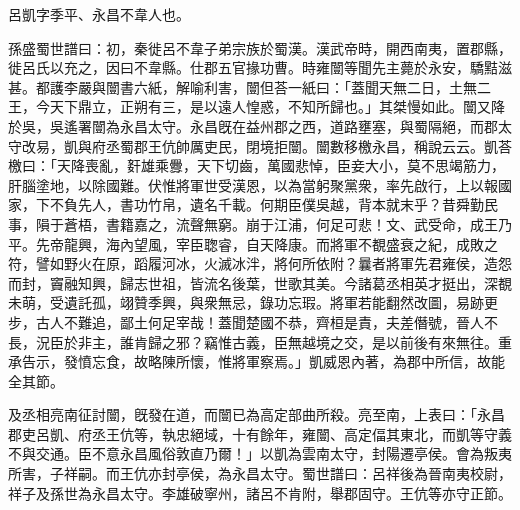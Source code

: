 
\begin{pinyinscope}
呂凱字季平、永昌不韋人也。

孫盛蜀世譜曰：初，秦徙呂不韋子弟宗族於蜀漢。漢武帝時，開西南夷，置郡縣，徙呂氏以充之，因曰不韋縣。仕郡五官掾功曹。時雍闓等聞先主薨於永安，驕黠滋甚。都護李嚴與闓書六紙，解喻利害，闓但荅一紙曰：「蓋聞天無二日，土無二王，今天下鼎立，正朔有三，是以遠人惶惑，不知所歸也。」其桀慢如此。闓又降於吳，吳遙署闓為永昌太守。永昌旣在益州郡之西，道路壅塞，與蜀隔絕，而郡太守改易，凱與府丞蜀郡王伉帥厲吏民，閉境拒闓。闓數移檄永昌，稱說云云。凱荅檄曰：「天降喪亂，姧雄乘釁，天下切齒，萬國悲悼，臣妾大小，莫不思竭筋力，肝腦塗地，以除國難。伏惟將軍世受漢恩，以為當躬聚黨衆，率先啟行，上以報國家，下不負先人，書功竹帛，遺名千載。何期臣僕吳越，背本就末乎？昔舜勤民事，隕于蒼梧，書籍嘉之，流聲無窮。崩于江浦，何足可悲！文、武受命，成王乃平。先帝龍興，海內望風，宰臣聦睿，自天降康。而將軍不覩盛衰之紀，成敗之符，譬如野火在原，蹈履河冰，火滅冰泮，將何所依附？曩者將軍先君雍侯，造怨而封，竇融知興，歸志世祖，皆流名後葉，世歌其美。今諸葛丞相英才挺出，深覩未萌，受遺託孤，翊贊季興，與衆無忌，錄功忘瑕。將軍若能翻然改圖，易跡更步，古人不難追，鄙土何足宰哉！蓋聞楚國不恭，齊桓是責，夫差僭號，晉人不長，況臣於非主，誰肯歸之邪？竊惟古義，臣無越境之交，是以前後有來無往。重承告示，發憤忘食，故略陳所懷，惟將軍察焉。」凱威恩內著，為郡中所信，故能全其節。

及丞相亮南征討闓，旣發在道，而闓已為高定部曲所殺。亮至南，上表曰：「永昌郡吏呂凱、府丞王伉等，執忠絕域，十有餘年，雍闓、高定偪其東北，而凱等守義不與交通。臣不意永昌風俗敦直乃爾！」以凱為雲南太守，封陽遷亭侯。會為叛夷所害，子祥嗣。而王伉亦封亭侯，為永昌太守。蜀世譜曰：呂祥後為晉南夷校尉，祥子及孫世為永昌太守。李雄破寧州，諸呂不肯附，舉郡固守。王伉等亦守正節。


\end{pinyinscope}
